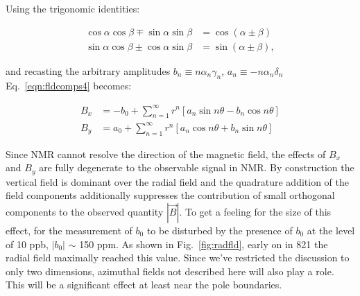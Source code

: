 Using the trigonomic identities:

\begin{center}
\begin{subequations}
\begin{align} 
\cos \alpha \cos \beta \mp \sin \alpha \sin \beta &= \cos (\alpha\pm\beta) \\
\sin \alpha \cos \beta \pm \cos \alpha \sin \beta &= \sin (\alpha\pm\beta), 
\end{align}
\label{eqn:trigid}
\end{subequations}
\par\end{center} 

\noindent and recasting the arbitrary amplitudes $b_n \equiv n\alpha_n \gamma_n$, $a_n \equiv -n\alpha_n \delta_n$ Eq.~\ref{eqn:fldcomps4} becomes:

\begin{center}
\begin{subequations}
\begin{align} 
B_x &= -b_0 + \sum\limits_{n=1}^\infty r^n\left[a_n \sin n\theta - b_n\cos n\theta \right] \\
B_y &= a_0 + \sum\limits_{n=1}^\infty r^n\left[a_n \cos n\theta + b_n\sin n\theta \right]
\end{align}
\label{eqn:fldcomps5}
\end{subequations}
\par\end{center} 

Since NMR cannot resolve the direction of the magnetic field, the effects of $B_x$ and $B_y$ are fully degenerate to the observable signal in NMR.  By construction the vertical field is dominant over the radial field and the quadrature addition of the field components additionally suppresses the contribution of small orthogonal components to the observed quantity $|\vec{B}|$.  To get a feeling for the size of this effect, for the measurement of $b_0$ to be disturbed by the presence of $b_0$ at the level of 10 ppb, $|b_0|$ $\sim$ 150 ppm.  As shown in Fig.~\ref{fig:radfld}, early on in 821 the radial field maximally reached this value.  Since we've restricted the discussion to only two dimensions, azimuthal fields not described here will also play a role.  This will be a significant effect at least near the pole boundaries.
